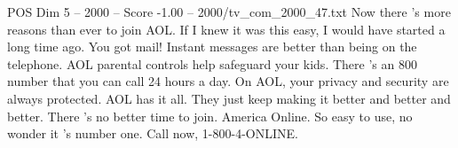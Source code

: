 \begin{textsample}{POS Dim 5 – 2000 – Score -1.00 – 2000/tv\_com\_2000\_47.txt}  \label{ex:f5_pos_068}
Now there 's more reasons than ever to join AOL.
If I knew it was this easy, I would have started a long time ago.
You got mail!
Instant messages are better than being on the telephone.
AOL parental controls help safeguard your kids.
There 's an 800 number that you can call 24 hours a day.
On AOL, your privacy and security are always protected.
AOL has it all.
They just keep making it better and better and better.
There 's no better time to join.
America Online.
So easy to use, no wonder it 's number one.
Call now, 1-800-4-ONLINE.

\end{textsample}
